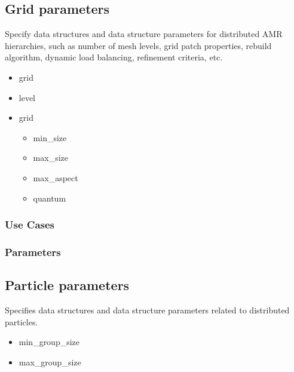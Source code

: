 \subsection{Grid parameters} \label{ss:params-grid}


Specify data structures and data structure parameters for distributed
AMR hierarchies, such as number of mesh levels, grid patch properties,
rebuild algorithm, dynamic load balancing, refinement criteria, etc.

\begin{itemize}
\item grid
\item level
\item grid
\begin{itemize}
\item min\_size
\item max\_size
\item max\_aspect
\item quantum
\end{itemize}
\end{itemize}


\subsubsection{Use Cases}
\subsubsection{Parameters}


\subsection{Particle parameters} \label{ss:params-particles}

Specifies data structures and data structure parameters related
to distributed particles.  

\begin{itemize}
\item min\_group\_size
\item max\_group\_size
\end{itemize}


